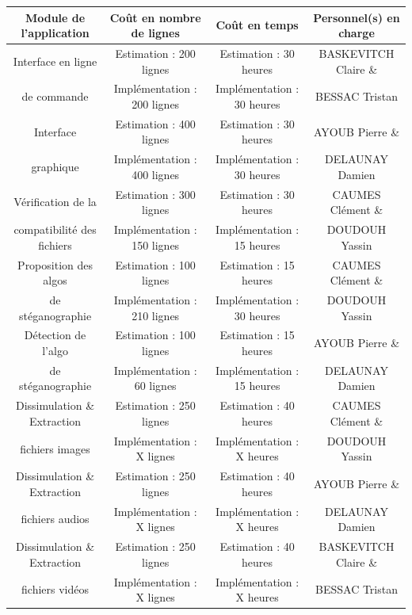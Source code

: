 \documentclass[11pt]{article}
\begin{document}
\small
\hspace{-1cm}
\begin{tabular}{|c|c|c|c|}
  \hline
  \textbf{Module de l'application} & \textbf{Coût en nombre de lignes} & \textbf{Coût en temps} & \textbf{Personnel(s) en charge} \\
  \hline
    Interface en ligne & Estimation : 200 lignes & Estimation : 30 heures & BASKEVITCH Claire \& \\ 
    de commande & Implémentation : 200 lignes & Implémentation : 30 heures & BESSAC Tristan \\
  \hline
  Interface & Estimation : 400 lignes & Estimation : 30 heures & AYOUB Pierre \& \\
  graphique & Implémentation : 400 lignes & Implémentation : 30 heures & DELAUNAY Damien \\
  \hline
  Vérification de la & Estimation : 300 lignes & Estimation : 30 heures & CAUMES Clément \& \\
   compatibilité des fichiers & Implémentation : 150 lignes & Implémentation : 15 heures & DOUDOUH Yassin \\
  \hline
    Proposition des algos & Estimation : 100 lignes & Estimation : 15 heures & CAUMES Clément \& \\
   de stéganographie & Implémentation : 210 lignes & Implémentation : 30 heures & DOUDOUH Yassin \\
  \hline
    Détection de l'algo & Estimation : 100 lignes & Estimation : 15 heures & AYOUB Pierre \& \\
   de stéganographie & Implémentation : 60 lignes & Implémentation : 15 heures & DELAUNAY Damien \\
  \hline
  Dissimulation \& Extraction & Estimation : 250 lignes & Estimation : 40 heures & CAUMES Clément \& \\
   fichiers images & Implémentation : X lignes & Implémentation : X heures & DOUDOUH Yassin \\
  \hline
  Dissimulation \& Extraction & Estimation : 250 lignes & Estimation : 40 heures & AYOUB Pierre \& \\
   fichiers audios & Implémentation : X lignes & Implémentation : X heures & DELAUNAY Damien \\
     \hline
  Dissimulation \& Extraction & Estimation : 250 lignes & Estimation : 40 heures & BASKEVITCH Claire \& \\
   fichiers vidéos & Implémentation : X lignes & Implémentation : X heures & BESSAC Tristan \\
  \hline
\end{tabular}
\normalsize
\vspace{0.5cm}
\end{document}
